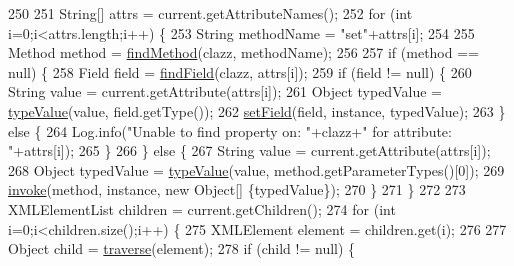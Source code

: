 \begin{DoxyCode}
250             
251             String[] attrs = current.getAttributeNames();
252             \textcolor{keywordflow}{for} (\textcolor{keywordtype}{int} i=0;i<attrs.length;i++) \{
253                 String methodName = \textcolor{stringliteral}{"set"}+attrs[i];
254                 
255                 Method method = \mbox{\hyperlink{classorg_1_1newdawn_1_1slick_1_1util_1_1xml_1_1_object_tree_parser_adeb37b83c1082cd794c9ec1ca5da9e9f}{findMethod}}(clazz, methodName);
256                 
257                 \textcolor{keywordflow}{if} (method == null) \{
258                     Field field = \mbox{\hyperlink{classorg_1_1newdawn_1_1slick_1_1util_1_1xml_1_1_object_tree_parser_a8498dcdf85563156aa04fd5dbc6b3637}{findField}}(clazz, attrs[i]);
259                     \textcolor{keywordflow}{if} (field != null) \{
260                         String value = current.getAttribute(attrs[i]);
261                         Object typedValue = \mbox{\hyperlink{classorg_1_1newdawn_1_1slick_1_1util_1_1xml_1_1_object_tree_parser_aec7415fa8c060d9a5841c7b54a50ff27}{typeValue}}(value, field.getType());
262                         \mbox{\hyperlink{classorg_1_1newdawn_1_1slick_1_1util_1_1xml_1_1_object_tree_parser_a9476f849ee25e45b5fa65229adf01cd2}{setField}}(field, instance, typedValue);
263                     \} \textcolor{keywordflow}{else} \{
264                         Log.info(\textcolor{stringliteral}{"Unable to find property on: "}+clazz+\textcolor{stringliteral}{" for attribute: "}+attrs[i]);
265                     \}
266                 \} \textcolor{keywordflow}{else} \{
267                     String value = current.getAttribute(attrs[i]);
268                     Object typedValue = \mbox{\hyperlink{classorg_1_1newdawn_1_1slick_1_1util_1_1xml_1_1_object_tree_parser_aec7415fa8c060d9a5841c7b54a50ff27}{typeValue}}(value, method.getParameterTypes()[0]);
269                     \mbox{\hyperlink{classorg_1_1newdawn_1_1slick_1_1util_1_1xml_1_1_object_tree_parser_a0c4e621ec62be84ee45a12a99714aa64}{invoke}}(method, instance, \textcolor{keyword}{new} Object[] \{typedValue\});
270                 \}
271             \}
272             
273             XMLElementList children = current.getChildren();
274             \textcolor{keywordflow}{for} (\textcolor{keywordtype}{int} i=0;i<children.size();i++) \{
275                 XMLElement element = children.get(i);
276                 
277                 Object child = \mbox{\hyperlink{classorg_1_1newdawn_1_1slick_1_1util_1_1xml_1_1_object_tree_parser_a1adc20e7ba6879b553d681e59f182126}{traverse}}(element);
278                 \textcolor{keywordflow}{if} (child != null) \{

\end{DoxyCode}
